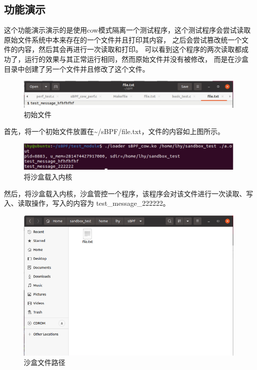 \documentclass[AutoFakeBold,a4paper]{ctexart}
\begin{document}
\subsection{功能演示}
这个功能演示演示的是使用cow模式隔离一个测试程序，这个测试程序会尝试读取原始文件系统中本来存在的一个文件并且打印其内容，
之后会尝试篡改统一个文件的内容，然后其会再进行一次读取和打印。 可以看到这个程序的两次读取都成功了，运行的效果与其正常运行相同，然而原始文件并没有被修改，
而是在沙盒目录中创建了另一个文件并且修改了这个文件。

\begin{figure}[H]
    \centering
    \includegraphics[width=\columnwidth]{pic8.png}
    \caption{初始文件}
\end{figure}

首先，将一个初始文件放置在{\ttfamily \~{}/sBPF/file.txt}，文件的内容如上图所示。

\begin{figure}[H]
    \centering
    \includegraphics[width=\columnwidth]{pic6.png}
    \caption{将沙盒载入内核}
\end{figure}

然后，将沙盒载入内核，沙盒管控一个程序，该程序会对该文件进行一次读取、写入、读取操作，写入的内容为
{\ttfamily test\_message\_222222}。

\begin{figure}[H]
    \centering
    \includegraphics[width=\columnwidth]{pic7.png}
    \caption{沙盒文件路径}
\end{figure}
\end{document}
